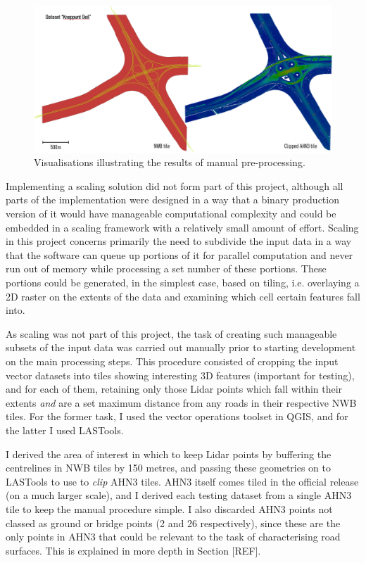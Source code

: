 \begin{figure}[]
    \centering
    \includegraphics[width=0.9\linewidth]{final_report/figs/manualpreprocessing.png}
    \caption{Visualisations illustrating the results of manual pre-processing.}
    \label{fig:manualpreprocessing}
\end{figure}

Implementing a scaling solution did not form part of this project, although all parts of the implementation were designed in a way that a binary production version of it would have manageable computational complexity and could be embedded in a scaling framework with a relatively small amount of effort. Scaling in this project concerns primarily the need to subdivide the input data in a way that the software can queue up portions of it for parallel computation and never run out of memory while processing a set number of these portions. These portions could be generated, in the simplest case, based on tiling, i.e. overlaying a 2D raster on the extents of the data and examining which cell certain features fall into.

As scaling was not part of this project, the task of creating such manageable subsets of the input data was carried out manually prior to starting development on the main processing steps. This procedure consisted of cropping the input vector datasets into tiles showing interesting 3D features (important for testing), and for each of them, retaining only those Lidar points which fall within their extents \textit{and} are a set maximum distance from any roads in their respective NWB tiles. For the former task, I used the vector operations toolset in QGIS, and for the latter I used LASTools.

I derived the area of interest in which to keep Lidar points by buffering the centrelines in NWB tiles by 150 metres, and passing these geometries on to LASTools to use to \textit{clip} AHN3 tiles. AHN3 itself comes tiled in the official release (on a much larger scale), and I derived each testing dataset from a single AHN3 tile to keep the manual procedure simple. I also discarded AHN3 points not classed as ground or bridge points (2 and 26 respectively), since these are the only points in AHN3 that could be relevant to the task of characterising road surfaces. This is explained in more depth in Section [REF]. 

